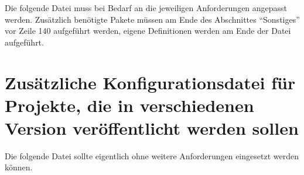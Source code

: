 \documentclass[ngerman,               %
               a4paper,               %
               fleqn,                 %
                     ]{scrartcl}       %
\begin{document}
Die folgende Datei muss bei Bedarf an die jeweiligen Anforderungen
angepasst werden. Zusätzlich benötigte Pakete müssen am Ende des
Abschnittes "`Sonstiges"' vor Zeile 140 aufgeführt werden, eigene
Definitionen werden am Ende der Datei aufgeführt.%


\section[Zusätzliche Konfigurationsdatei für Projekte]{%
  Zusätzliche Konfigurationsdatei für Projekte, die in verschiedenen
  Version veröffentlicht werden sollen}%
\label{sec:zus-konfiguration}

Die folgende Datei sollte eigentlich ohne weitere Anforderungen
eingesetzt werden können.%




\backmatter                     %

\printbibliography
\end{document}
